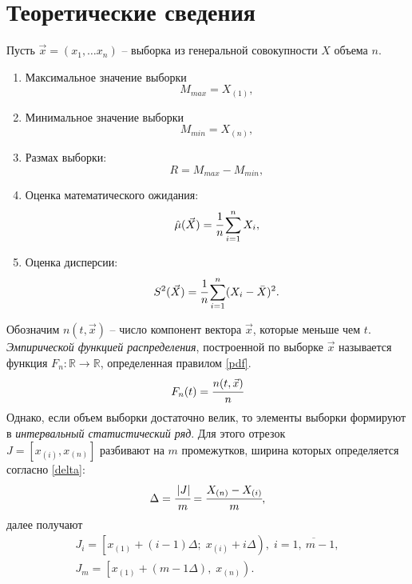 \chapter{Теоретические сведения}
Пусть $\vec{x} = (x_1, \dots x_n)$ -- выборка из генеральной совокупности $X$ объема $n$.
\begin{enumerate}[wide=0pt]
	\item Максимальное значение выборки
	\begin{equation}
		M_{max} = X_{(1)},
	\end{equation}
	\item Минимальное значение выборки
	\begin{equation}
		M_{min} = X_{(n)},
	\end{equation}
	\item Размах выборки:
	\begin{equation}
		R = M_{max} - M_{min},
	\end{equation}
	\item Оценка математического ожидания:
	\begin{equation}
		\hat{\mu}(\vec{X}) = \cfrac{1}{n}\sum_{i = 1}^{n}X_i,
	\end{equation}
	\item Оценка дисперсии:
	\begin{equation}
		S^2(\vec{X}) = \cfrac{1}{n}\sum_{i = 1}^{n}(X_i - \bar{X})^2.
	\end{equation}
\end{enumerate}
Обозначим $n(t, \vec{x})$ -- число компонент вектора $\vec{x}$, которые меньше чем $t$. \textit{Эмпирической функцией распределения}, построенной по выборке $\vec{x}$ называется функция $F_n: \mathbb{R} \rightarrow \mathbb{R}$, определенная правилом \ref{pdf}.
\begin{equation}\label{pdf}
	F_n(t) = \cfrac{n(t, \vec{x})}{n}
\end{equation}
Однако, если объем выборки достаточно велик, то элементы выборки формируют в \textit{интервальный статистический ряд}. Для этого отрезок \\ $J = [x_{(i)}, x_{(n)}]$ разбивают на $m$ промежутков, ширина которых определяется согласно \ref{delta}:
\begin{equation}\label{delta}
	\Delta = \cfrac{\left|J\right|}{m} = \cfrac{X_{(n)} - X_{(i)}}{m},
\end{equation}
далее получают 
\begin{equation}
	\begin{array}{ll}
		J_i = \left[x_{(1)} + \left(i - 1\right)\Delta; \; x_{(i)} + i\Delta\right), \; i = \overline{1,\: m - 1},\\
		J_m = \left[ x_{(1)} + \left(m - 1\Delta\right), \; x_{(n)}\right).
	\end{array}
\end{equation}
